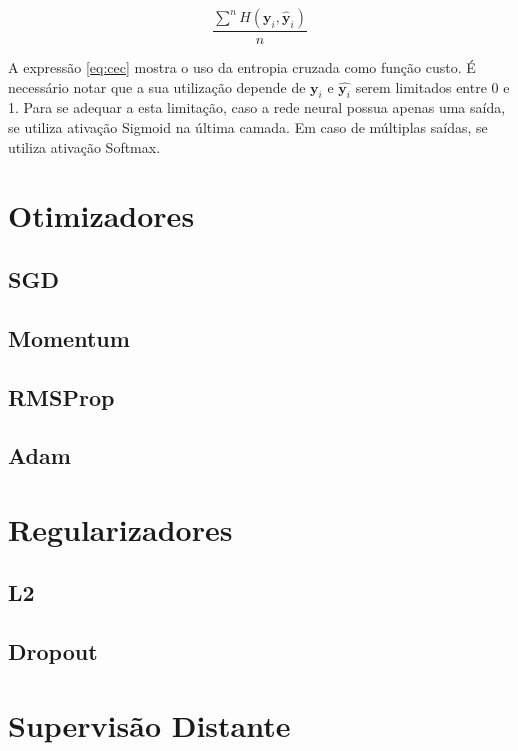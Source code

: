     \begin{equation} \label{eq:cec}
    \frac{\displaystyle\sum^n H(\mathbf{y}_i, \hat{\mathbf{y}}_i)}{n}
\end{equation}

A expressão \ref{eq:cec} mostra o uso da entropia cruzada como função custo. É necessário notar que a sua utilização depende de $\mathbf{y}_i$ e $\hat{\mathbf{y}_i}$ serem limitados entre 0 e 1. Para se adequar a esta limitação, caso a rede neural possua apenas uma saída, se utiliza ativação Sigmoid na última camada. Em caso de múltiplas saídas, se utiliza ativação Softmax.

\section{Otimizadores}

\subsection{SGD}

\subsection{Momentum}

\subsection{RMSProp}

\subsection{Adam}

\section{Regularizadores} \label{sec:regularizadores}

\subsection{L2}

\subsection{Dropout}

\section{Supervisão Distante}
